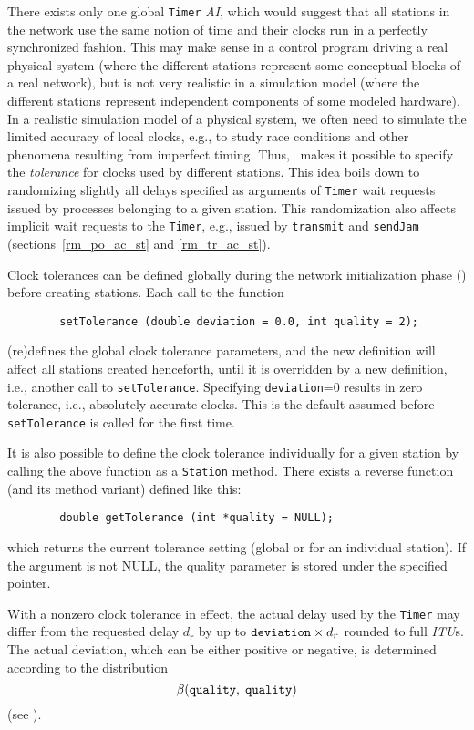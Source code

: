 There exists only one global {\tt Timer} {\em AI}, which would suggest that all
stations in the network use the same notion of time and their clocks run
in a perfectly synchronized fashion.
This may make sense in a control program driving a real physical system
(where the different stations represent some conceptual blocks of a real
network),
but is not very realistic in a simulation model (where the different stations
represent independent components of some modeled hardware).
In a realistic simulation model of a physical system, we often need to
simulate the limited accuracy of local clocks, e.g., to study race
conditions and other phenomena resulting from imperfect timing.
Thus, \smurph\ makes it possible to specify the {\em tolerance\/} for clocks
used by different stations.
This idea boils down to randomizing slightly all delays specified as
arguments of {\tt Timer} wait requests issued by processes belonging to a
given station.
This randomization also affects implicit wait requests to the {\tt Timer},
e.g., issued by {\tt transmit} and {\tt sendJam}
(sections~\ref{rm_po_ac_st} and \ref{rm_tr_ac_st}).

Clock tolerances can be defined globally during the network initialization
phase () before creating stations.
Each call to the function
\begin{verbatim}
        setTolerance (double deviation = 0.0, int quality = 2);
\end{verbatim}
(re)defines the global clock tolerance parameters, and the new definition
will affect all stations
created henceforth, until it is overridden by a new definition, i.e.,
another call to {\tt setTolerance}.
Specifying {\tt deviation}=0 results in
zero tolerance, i.e., absolutely accurate clocks.
This is the default assumed before {\tt setTolerance} is called for the first
time.

It is also possible to define the clock tolerance individually for a given
station by calling the above function as a {\tt Station} method.
There exists a reverse function (and its method variant) defined like this:
\begin{verbatim}
        double getTolerance (int *quality = NULL);
\end{verbatim}
\noindent
which returns the current tolerance setting (global or for an individual
station).
If the argument is not NULL, the quality parameter is stored under the
specified pointer.

With a nonzero clock tolerance in effect, the actual delay used by the
{\tt Timer} may differ from the requested delay $d_r$
by up to 
${\tt deviation} \times d_r$ rounded to full {\em ITU\/}s.
The actual deviation, which can be either positive or negative,
is determined according to the distribution
\[
\beta ({\tt quality},\;{\tt quality})
\]
(see ).


